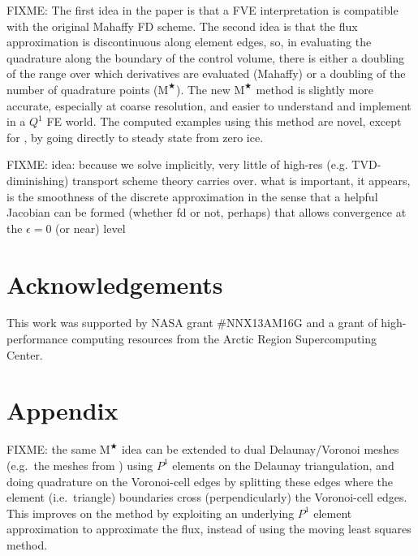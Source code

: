 \documentclass[twocolumn,letterpaper]{igs}
\newcommand\eps{\epsilon}
\newcommand{\Mstar}{$\text{M}^{\bigstar}$\xspace}
\begin{document}
FIXME: The first idea in the paper is that a FVE interpretation is compatible with the original Mahaffy FD scheme.  The second idea is that the flux approximation is discontinuous along element edges, so, in evaluating the quadrature along the boundary of the control volume, there is either a doubling of the range over which derivatives are evaluated (Mahaffy) or a doubling of the number of quadrature points (\Mstar).  The new \Mstar method is slightly more accurate, especially at coarse resolution, and easier to understand and implement in a $Q^1$ FE world.  The computed examples using this method are novel, except for \cite{JouvetBueler2012}, by going directly to steady state from zero ice.

FIXME: idea: because we solve implicitly, very little of high-res (e.g. TVD-diminishing) transport scheme theory carries over.  what is important, it appears, is the smoothness of the discrete approximation in the sense that a helpful Jacobian can be formed (whether fd or not, perhaps) that allows convergence at the $\eps=0$ (or near) level


\section*{Acknowledgements}
This work was supported by NASA grant \#NNX13AM16G and a grant of high-performance computing resources from the Arctic Region Supercomputing Center.





\appendix
\section{Appendix}  \label{sec:app}

FIXME: the same \Mstar idea can be extended to dual Delaunay/Voronoi meshes (e.g.~the meshes from \cite{EgholmNielsen2010,Ringleretal2013}) using $P^1$ elements on the Delaunay triangulation, and doing quadrature on the Voronoi-cell edges by splitting these edges where the element (i.e.~triangle) boundaries cross (perpendicularly) the Voronoi-cell edges.  This improves on the \cite{EgholmNielsen2010} method by exploiting an underlying $P^1$ element approximation to approximate the flux, instead of using the moving least squares method.
\end{document}
